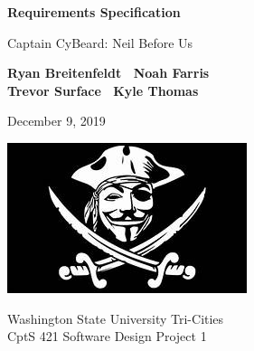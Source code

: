 \begin{titlepage}
    \begin{center}
        \vspace*{1cm}

        \Huge
        \textbf{Requirements Specification}

        \vspace{.5cm}
        \LARGE
        Captain CyBeard: Neil Before Us

        \vspace{1cm}

        \textbf{Ryan Breitenfeldt \textbar\ Noah Farris\\ Trevor Surface \textbar\ Kyle Thomas}

        \vspace{.2cm}
        \Large
        December 9, 2019

        \vspace{2cm}
        \includegraphics[scale=1]{logo}

        \vfill

        Washington State University Tri-Cities\\
        CptS 421 Software Design Project 1

    \end{center}
\end{titlepage}

